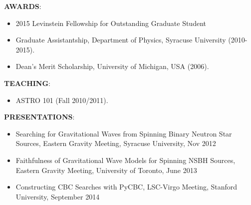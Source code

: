 {\bf AWARDS}:
\begin{itemize}
\item 2015 Levinstein Fellowship for Outstanding Graduate Student
\item Graduate Assistantship, Department of Physics, Syracuse University (2010-2015).
\item Dean's Merit Scholarship, University of Michigan, USA (2006).
\end{itemize}
{\bf TEACHING}:
\begin{itemize}
\item ASTRO 101 (Fall 2010/2011).
\end{itemize}
{\bf PRESENTATIONS}:
\begin{itemize}
\item Searching for Gravitational Waves from Spinning Binary Neutron Star Sources, Eastern Gravity Meeting, Syracuse University, Nov 2012
\item Faithfulness of Gravitational Wave Models for Spinning NSBH Sources, Eastern Gravity Meeting, University of Toronto, June 2013
\item Constructing CBC Searches with PyCBC, LSC-Virgo Meeting, Stanford University, September 2014
\end{itemize}
